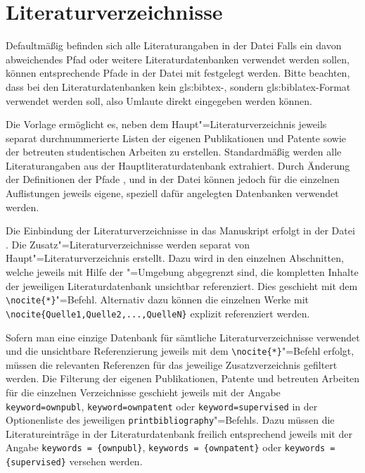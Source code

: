 \section{Literaturverzeichnisse}%
\label{sec:Literaturverzeichnisse}%
%
Defaultmäßig befinden sich alle Literaturangaben in der Datei
Falls ein davon abweichendes Pfad oder weitere Literaturdatenbanken
verwendet werden sollen, können entsprechende Pfade in der Datei
 mit
\lstinline||
festgelegt werden.
Bitte beachten, dass bei den Literaturdatenbanken kein \gls{gls:bibtex}-,
sondern \gls{gls:biblatex}-Format verwendet werden soll,
also Umlaute direkt eingegeben werden können.

Die Vorlage ermöglicht es, neben dem Haupt"=Literaturverzeichnis
jeweils separat durchnummerierte Listen der eigenen Publikationen und Patente
sowie der betreuten studentischen Arbeiten zu erstellen.
Standardmäßig werden alle Literaturangaben aus der Hauptliteraturdatenbank
 extrahiert.
Durch Änderung der Definitionen der Pfade
,
 und
in der Datei
können jedoch für die einzelnen Auflistungen 
jeweils eigene, speziell dafür angelegten Datenbanken verwendet werden.

Die Einbindung der Literaturverzeichnisse in das Manuskript erfolgt in der Datei
.
Die Zusatz"=Literaturverzeichnisse werden separat von Haupt"=Literaturverzeichnis erstellt.
Dazu wird in den einzelnen Abschnitten,
welche jeweils mit Hilfe der "=Umgebung abgegrenzt sind,
die kompletten Inhalte der jeweiligen Literaturdatenbank unsichtbar referenziert.
Dies geschieht mit dem \lstinline|\nocite{*}|"=Befehl.
Alternativ dazu können die einzelnen Werke mit
\lstinline|\nocite{Quelle1,Quelle2,...,QuelleN}|
explizit referenziert werden.

Sofern man eine einzige Datenbank für sämtliche Literaturverzeichnisse verwendet
und die unsichtbare Referenzierung jeweils mit dem \lstinline|\nocite{*}|"=Befehl erfolgt,
müssen die relevanten Referenzen für das jeweilige Zusatzverzeichnis
gefiltert werden.
Die Filterung der eigenen Publikationen, Patente und betreuten Arbeiten
für die einzelnen Verzeichnisse geschieht jeweils mit der Angabe
\lstinline|keyword=ownpubl|,
\lstinline|keyword=ownpatent|
oder
\lstinline|keyword=supervised|
in der Optionenliste des jeweiligen
\lstinline|printbibliography|"=Befehls.
Dazu müssen die Literatureinträge in der Literaturdatenbank freilich
entsprechend jeweils mit der Angabe
\lstinline|keywords = {ownpubl}|,
\lstinline|keywords = {ownpatent}|
oder
\lstinline|keywords = {supervised}|
versehen werden.

